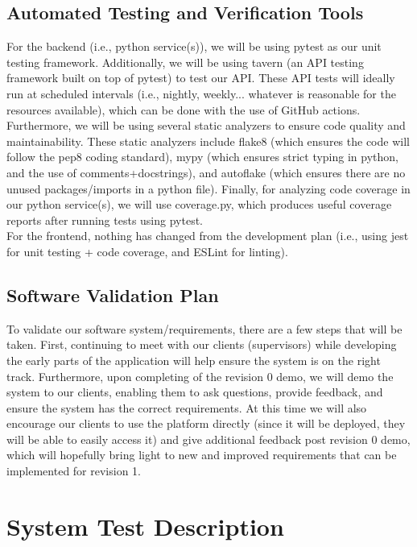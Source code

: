 \documentclass[12pt, titlepage]{article}
\begin{document}
\subsection{Automated Testing and Verification Tools}

For the backend (i.e., python service(s)), we will be using pytest as our unit testing framework. Additionally,
we will be using tavern (an API testing framework built on top of pytest) to test our API. These API tests will
ideally run at scheduled intervals (i.e., nightly, weekly... whatever is reasonable for the resources available), which can be 
done with the use of GitHub actions. Furthermore, we will be using several static analyzers to ensure code quality and maintainability. These 
static analyzers include flake8 (which ensures the code will follow the pep8 coding standard), mypy (which ensures strict typing in python,
and the use of comments+docstrings), and autoflake (which ensures there are no unused packages/imports in a python file). Finally, for analyzing 
code coverage in our python service(s), we will use coverage.py, which produces useful coverage reports after running tests using pytest.\\

For the frontend, nothing has changed from the development plan (i.e., using jest for unit testing + code coverage, and ESLint for linting).

\subsection{Software Validation Plan}

To validate our software system/requirements, there are a few steps that will be taken. First, continuing to meet with our clients (supervisors) while developing
the early parts of the application will help ensure the system is on the right track. Furthermore, upon completing of the revision 0 demo, we will
demo the system to our clients, enabling them to ask questions, provide feedback, and ensure the system has the correct requirements. At this
time we will also encourage our clients to use the platform directly (since it will be deployed, they will be able to easily access it) and give additional feedback post revision 0 demo,
which will hopefully bring light to new and improved requirements that can be implemented for revision 1. 

\section{System Test Description}
	
\end{document}
